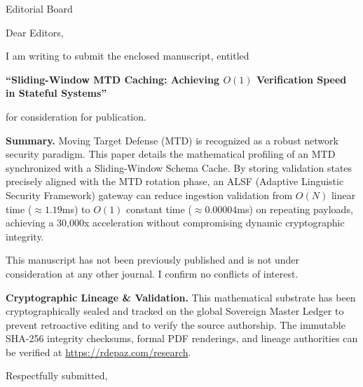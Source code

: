 \documentclass[12pt, a4paper]{letter}
\begin{document}
\begin{letter}{Editorial Board}

\opening{Dear Editors,}

I am writing to submit the enclosed manuscript, entitled

\begin{center}
\textbf{``Sliding-Window MTD Caching: Achieving $O(1)$ Verification Speed in Stateful Systems''}
\end{center}

\noindent for consideration for publication.

\medskip

\textbf{Summary.} Moving Target Defense (MTD) is recognized as a robust network security paradigm. This paper details the mathematical profiling of an MTD synchronized with a Sliding-Window Schema Cache. By storing validation states precisely aligned with the MTD rotation phase, an ALSF (Adaptive Linguistic Security Framework) gateway can reduce ingestion validation from $O(N)$ linear time ($\approx 1.19$ms) to $O(1)$ constant time ($\approx 0.00004$ms) on repeating payloads, achieving a 30,000x acceleration without compromising dynamic cryptographic integrity.

\medskip

This manuscript has not been previously published and is not under consideration
at any other journal. I confirm no conflicts of interest.

\textbf{Cryptographic Lineage \& Validation.} This mathematical substrate has been cryptographically sealed and tracked on the global Sovereign Master Ledger to prevent retroactive editing and to verify the source authorship. The immutable SHA-256 integrity checksums, formal PDF renderings, and lineage authorities can be verified at \url{https://rdepaz.com/research}.

\medskip

\closing{Respectfully submitted,}
\end{letter}
\end{document}
